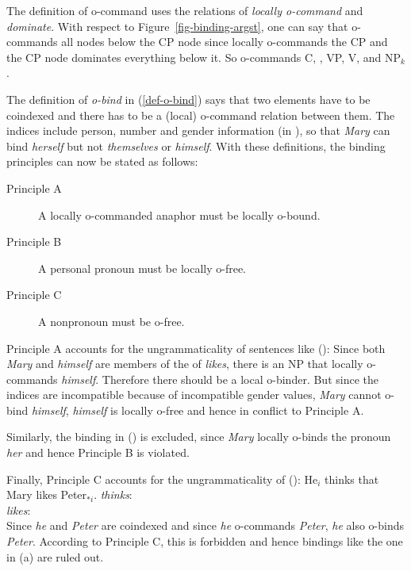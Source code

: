 \documentclass[output=paper,biblatex,babelshorthands,newtxmath,draftmode,colorlinks,citecolor=brown]{langscibook}
\begin{document}
The definition of o-command uses the relations of \emph{locally o-command} and \emph{dominate}. With respect to
Figure~\ref{fig-binding-argst}, one can say that \NPi o-commands all nodes below the CP node since
\NPi locally o-commands the CP and the CP node dominates everything below it. So \NPi o-commands
C, \NPj, VP, V, and NP$_k$.

The definition of \emph{o-bind} in (\ref{def-o-bind}) says that two elements have to be coindexed
and there has to be a (local) o-command relation between them. The indices include person, number
and gender information (in ), so that \emph{Mary} can bind \emph{herself} but not
\emph{themselves} or \emph{himself}. With these definitions, the binding principles can now be stated
as follows:

\begin{principle-break}
\begin{description}
\item [Principle A] A locally o-commanded anaphor must be locally o-bound.
\item [Principle B] A personal pronoun must be locally o-free.
\item [Principle C] A nonpronoun must be o-free.
\end{description}
\end{principle-break}

\noindent
Principle A accounts for the ungrammaticality of sentences like ():
\eal
{}
\zl
Since both \emph{Mary} and \emph{himself} are members of the \argstl of \emph{likes}, there is an NP
that locally o-commands \emph{himself}. Therefore there should be a local o-binder. But since the
indices are incompatible because of incompatible gender values, \emph{Mary} cannot o-bind
\emph{himself}, \emph{himself} is locally o-free and hence in conflict to Principle A.

Similarly, the binding in () is excluded, since \emph{Mary} locally o-binds the pronoun \emph{her}
and hence Principle B is violated.
\eal
{}
\zl

\noindent
Finally, Principle C accounts for the ungrammaticality of ():
\eal
\ex He$_i$ thinks that Mary likes Peter$_{*i}$.
\ex \emph{thinks}:\\
\argst {}
\ex \emph{likes}:\\
\argst {}
\zl
Since \emph{he} and \emph{Peter} are coindexed and since \emph{he} o-commands \emph{Peter},
\emph{he} also o-binds \emph{Peter}. According to Principle C, this is forbidden and hence bindings
like the one in (a) are ruled out.
\end{document}

